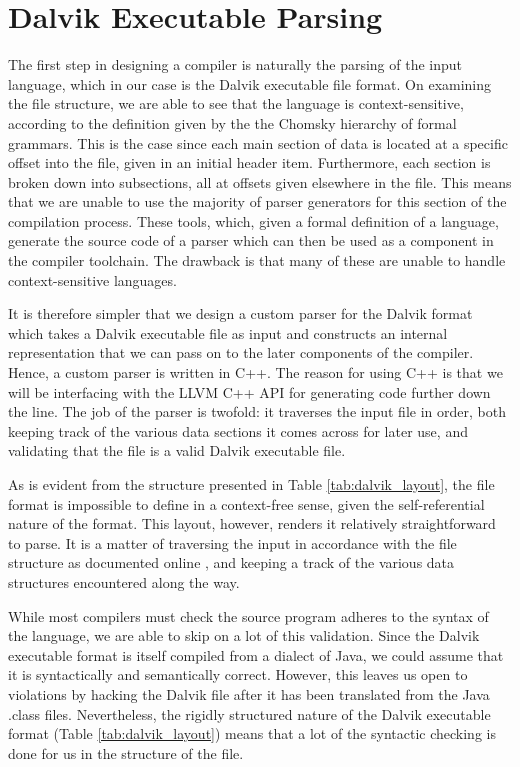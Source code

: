 \section{Dalvik Executable Parsing}
\label{sec:parsing}

The first step in designing a compiler is naturally the parsing of the input language, which in our case is the Dalvik executable file format. On examining the file structure, we are able to see that the language is context-sensitive, according to the definition given by the the Chomsky hierarchy of formal grammars. This is the case since each main section of data is located at a specific offset into the file, given in an initial header item. Furthermore, each section is broken down into subsections, all at offsets given elsewhere in the file. This means that we are unable to use the majority of parser generators for this section of the compilation process. These tools, which, given a formal definition of a language, generate the source code of a parser which can then be used as a component in the compiler toolchain. The drawback is that many of these are unable to handle context-sensitive languages.


It is therefore simpler that we design a custom parser for the Dalvik format which takes a Dalvik executable file as input and constructs an internal representation that we can pass on to the later components of the compiler. Hence, a custom parser is written in C++. The reason for using C++ is that we will be interfacing with the LLVM C++ API for generating code further down the line. The job of the parser is twofold: it traverses the input file in order, both keeping track of the various data sections it comes across for later use, and validating that the file is a valid Dalvik executable file.

As is evident from the structure presented in Table \ref{tab:dalvik_layout}, the file format is impossible to define in a context-free sense, given the self-referential nature of the format. This layout, however, renders it relatively straightforward to parse. It is a matter of traversing the input in accordance with the file structure as documented online \cite{dvk_format}, and keeping a track of the various data structures encountered along the way.

While most compilers must check the source program adheres to the syntax of the language, we are able to skip on a lot of this validation. Since the Dalvik executable format is itself compiled from a dialect of Java, we could assume that it is syntactically and semantically correct. However, this leaves us open to violations by hacking the Dalvik file after it has been translated from the Java .class files. Nevertheless, the rigidly structured nature of the Dalvik executable format (Table \ref{tab:dalvik_layout}) means that a lot of the syntactic checking is done for us in the structure of the file.

